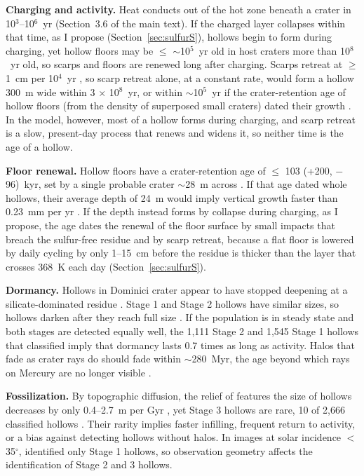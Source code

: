 \documentclass{planetary}
\begin{document}
\textbf{Charging and activity.} Heat conducts out of the hot zone beneath a crater in 10$^3$--10$^6$~yr (Section~3.6 of the main text). If the charged layer collapses within that time, as I propose (Section~\ref{sec:sulfurS}), hollows begin to form during charging, yet hollow floors may be $\leq$ $\sim$10$^5$~yr old \parencite{wang2020} in host craters more than 10$^8$~yr old, so scarps and floors are renewed long after charging. Scarps retreat at $\geq$ 1~cm per 10$^4$~yr \parencite{blewett2016}, so scarp retreat alone, at a constant rate, would form a hollow 300~m wide within 3 $\times$ 10$^8$~yr, or within $\sim$10$^5$~yr if the crater-retention age of hollow floors (from the density of superposed small craters) dated their growth \parencite{wang2020}. In the model, however, most of a hollow forms during charging, and scarp retreat is a slow, present-day process that renews and widens it, so neither time is the age of a hollow.

\textbf{Floor renewal.} Hollow floors have a crater-retention age of $\leq$ 103 (+200, $-$96)~kyr, set by a single probable crater $\sim$28~m across \parencite{wang2020}. If that age dated whole hollows, their average depth of 24~m would imply vertical growth faster than 0.23~mm per yr \parencite{wang2020}. If the depth instead forms by collapse during charging, as I propose, the age dates the renewal of the floor surface by small impacts that breach the sulfur-free residue and by scarp retreat, because a flat floor is lowered by daily cycling by only 1--15~cm before the residue is thicker than the layer that crosses 368~K each day (Section~\ref{sec:sulfurS}).

\textbf{Dormancy.} Hollows in Dominici crater appear to have stopped deepening at a silicate-dominated residue \parencite{emran2025}. Stage 1 and Stage 2 hollows have similar sizes, so hollows darken after they reach full size \parencite{deutsch2025}. If the population is in steady state and both stages are detected equally well, the 1,111 Stage 2 and 1,545 Stage 1 hollows that \textcite{deutsch2025} classified imply that dormancy lasts 0.7 times as long as activity. Halos that fade as crater rays do should fade within $\sim$280~Myr, the age beyond which rays on Mercury are no longer visible \parencite{banks2017}.

\textbf{Fossilization.} By topographic diffusion, the relief of features the size of hollows decreases by only 0.4--2.7~m per Gyr \parencite{phillips2021}, yet Stage 3 hollows are rare, 10 of 2,666 classified hollows \parencite{deutsch2025}. Their rarity implies faster infilling, frequent return to activity, or a bias against detecting hollows without halos. In images at solar incidence $<$ 35$^\circ$, \textcite{deutsch2025} identified only Stage 1 hollows, so observation geometry affects the identification of Stage 2 and 3 hollows.
\end{document}

